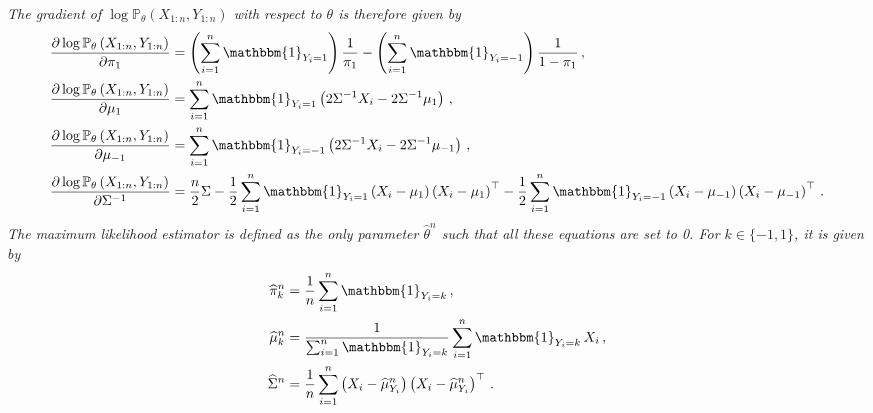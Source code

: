 \documentclass[a4paper,10pt,fleqn]{article}
\newcommand{\eqsp}{\,}
\newcommand{\bP}{\mathbb{P}}
\newcommand{\1}{\ensuremath{\mathbbm{1}}}
\begin{document}
\begin{enumerate}
\vspace{.2cm}

{\em
The gradient of $\log \bP_{\theta}\left(X_{1:n},Y_{1:n}\right)$ with respect to $\theta$ is therefore given by
\begin{align*}
\frac{\partial \log \bP_{\theta}\left(X_{1:n},Y_{1:n}\right)}{\partial \pi_1} &= \left(\sum_{i=1}^n\1_{Y_i=1}\right)\frac{1}{\pi_1} - \left(\sum_{i=1}^n\1_{Y_i=-1}\right)\frac{1}{1-\pi_{1}}\eqsp,\\
\frac{\partial \log \bP_{\theta}\left(X_{1:n},Y_{1:n}\right)}{\partial \mu_1} &= \sum_{i=1}^n\1_{Y_i=1}\left(2\Sigma^{-1}X_i - 2\Sigma^{-1}\mu_{1}\right)\eqsp,\\
\frac{\partial \log \bP_{\theta}\left(X_{1:n},Y_{1:n}\right)}{\partial \mu_{-1}} &= \sum_{i=1}^n\1_{Y_i=-1}\left(2\Sigma^{-1}X_i - 2\Sigma^{-1}\mu_{-1}\right)\eqsp,\\
\frac{\partial \log \bP_{\theta}\left(X_{1:n},Y_{1:n}\right)}{\partial \Sigma^{-1}} &= \frac{n}{2}\Sigma -  \frac{1}{2}\sum_{i=1}^n\1_{Y_i=1}\left(X_i - \mu_{1}\right)\left(X_i - \mu_{1}\right)^\top -  \frac{1}{2}\sum_{i=1}^n\1_{Y_i=-1}\left(X_i - \mu_{-1}\right)\left(X_i - \mu_{-1}\right)^\top\eqsp.
\end{align*}
The maximum likelihood estimator is defined as the only parameter $\widehat \theta^n$ such that all these equations are set to 0. For $k\in\{-1,1\}$,  it is given by
\begin{align*}
\widehat \pi_k^n &= \frac{1}{n}\sum_{i=1}^n\1_{Y_i=k}\eqsp,\\
\widehat \mu_k^n &= \frac{1}{\sum_{i=1}^n\1_{Y_i=k}}\sum_{i=1}^n\1_{Y_i=k}\,X_i\eqsp,\\
\widehat\Sigma^n &= \frac{1}{n}\sum_{i=1}^n \left(X_i - \widehat \mu_{Y_i}^n\right)\left(X_i - \widehat \mu_{Y_i}^n\right)^\top\eqsp.
\end{align*}
}
\end{enumerate}
\end{document}

